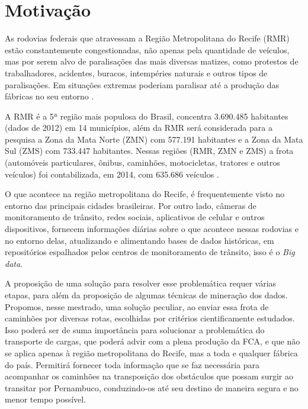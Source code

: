 
\section{ Motivação}\label{intro:motivacao}

As rodovias federais que atravessam a Região Metropolitana do Recife (RMR) estão constantemente congestionadas, não apenas pela 
quantidade de veículos, mas por serem alvo de paralisações das mais diversas matizes, como protestos de trabalhadores, acidentes, 
buracos, intempéries naturais e outros tipos de paralisações. 
Em situações extremas poderiam paralisar até a produção das fábricas no seu entorno \cite{BNDES2013}. 

A RMR é a 5ª região mais populosa do Brasil, concentra 3.690.485 habitantes (dados de 2012) \cite{Bitoun2012} em 14 municípios, além da RMR 
será considerada para a pesquisa a Zona da Mata Norte (ZMN) com 577.191 habitantes e a Zona da Mata Sul (ZMS) com 733.447 habitantes. 
Nessas regiões (RMR, ZMN e ZMS) a frota (automóveis particulares, ônibus, caminhões, motocicletas, tratores e outros veículos) 
foi contabilizada, em 2014, com 635.686 veículos \cite{FrotaVeiculosIBGE}.

O que acontece na região metropolitana do Recife, é frequentemente visto no entorno das principais cidades brasileiras.
Por outro lado, câmeras de monitoramento de trânsito, redes sociais, aplicativos de celular e outros dispositivos, fornecem informações diárias sobre o que acontece nessas 
rodovias e no entorno delas, atualizando e alimentando bases de dados históricas, em repositórios espalhados pelos centros de monitoramento de trânsito, isso é o \textit{Big data}.

A proposição de uma solução para resolver esse problemática requer várias etapas, para além da proposição de algumas técnicas de mineração dos dados.
Propomos, nesse mestrado, uma solução peculiar, ao enviar essa frota de caminhões por diversas rotas, escolhidas por critérios cientificamente estudados.
Isso poderá ser de suma importância para solucionar a problemática do transporte de cargas, que poderá advir com a plena produção da FCA, e que não se aplica apenas 
à região metropolitana do Recife, mas a toda e qualquer fábrica do país. Permitirá fornecer toda informação que se faz necessária para acompanhar os
caminhões na transposição dos obstáculos que possam surgir ao transitar por Pernambuco, conduzindo-os até seu destino de maneira segura e no menor tempo possível.


